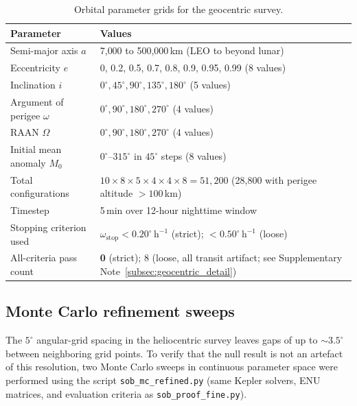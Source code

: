 \documentclass[11pt,a4paper]{article}
\begin{document}
\begin{table}[h]
  \caption{Orbital parameter grids for the geocentric survey.}
  \label{tab:ggrid}
  \centering
  \small
  \begin{tabular}{@{}lp{10cm}@{}}
    \toprule
    Parameter & Values \\
    \midrule
    Semi-major axis $a$ & 7{,}000 to 500{,}000\,km (LEO to beyond lunar) \\
    Eccentricity $e$ & 0, 0.2, 0.5, 0.7, 0.8, 0.9, 0.95, 0.99 (8 values) \\
    Inclination $i$ & $0^\circ, 45^\circ, 90^\circ, 135^\circ, 180^\circ$ (5 values) \\
    Argument of perigee $\omega$ & $0^\circ, 90^\circ, 180^\circ, 270^\circ$ (4 values) \\
    RAAN $\Omega$ & $0^\circ, 90^\circ, 180^\circ, 270^\circ$ (4 values) \\
    Initial mean anomaly $M_0$ & $0^\circ$--$315^\circ$ in $45^\circ$ steps (8 values) \\
    \midrule
    Total configurations & $10 \times 8 \times 5 \times 4 \times 4 \times 8 = 51{,}200$
      (28,800 with perigee altitude $>100$\,km) \\
    Timestep & 5\,min over 12-hour nighttime window \\
    Stopping criterion used & $\omega_\mathrm{stop} < 0.20^\circ\,\mathrm{h}^{-1}$ (strict);
      $< 0.50^\circ\,\mathrm{h}^{-1}$ (loose) \\
    All-criteria pass count & \textbf{0} (strict); 8 (loose, all transit artifact; see Supplementary Note~\ref{subsec:geocentric_detail}) \\
    \bottomrule
  \end{tabular}
\end{table}

\subsection{Monte Carlo refinement sweeps}
\label{subsec:mc_refined}

The $5^\circ$ angular-grid spacing in the heliocentric survey leaves gaps
of up to ${\sim}3.5^\circ$ between neighboring grid points.
To verify that the null result is not an artefact of this resolution,
two Monte Carlo sweeps in continuous parameter space were performed using
the script \texttt{sob\_mc\_refined.py} (same Kepler solvers, ENU
matrices, and evaluation criteria as \texttt{sob\_proof\_fine.py}).
\end{document}
